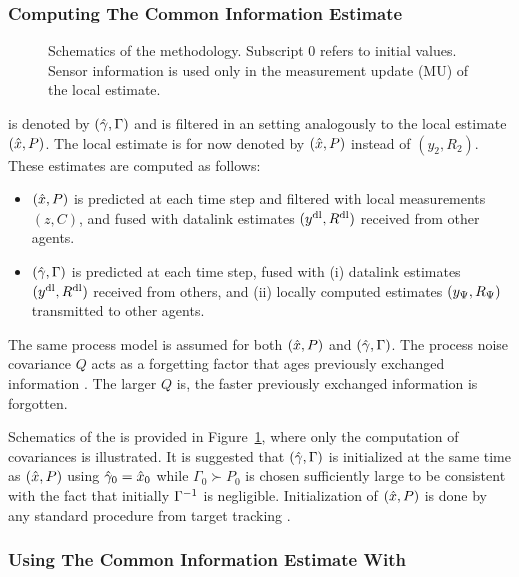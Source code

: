 \subsubsection{Computing The Common Information Estimate}

\begin{figure}[t]
	\centering
	\begin{tikzpicture}[scale=.52]
		
	\end{tikzpicture}
	\caption{Schematics of the \abbrCIE methodology. Subscript 0 refers to initial values. Sensor information is used only in the measurement update (MU) of the local estimate. } 
	\label{fig:cie:filtering-scheme}
\end{figure}

\abbrCIE is denoted by $(\gammahat,\Gamma)$ and is filtered in an \abbrEKF setting analogously to the local estimate $(\xhat,P)$. The local estimate is for now denoted by $(\xhat,P)$ instead of $(y_2,R_2)$. These estimates are computed as follows:
\begin{itemize}
	\item $(\xhat,P)$ is predicted at each time step and filtered with local measurements $(z,C)$, and fused with datalink estimates $(\yDL,\RDL)$ received from other agents.
	\item $(\gammahat,\Gamma)$ is predicted at each time step, fused with (i) datalink estimates $(\yDL,\RDL)$ received from others, and (ii) locally computed \abbrDR estimates $(\yM,\RM)$ transmitted to other agents. 
\end{itemize} 
The same process model is assumed for both $(\xhat,P)$ and $(\gammahat,\Gamma)$. The process noise covariance $Q$ acts as a forgetting factor that ages previously exchanged information \cite{Forsling2020Fusion}. The larger $Q$ is, the faster previously exchanged information is forgotten.

Schematics of the \abbrCIE is provided in Figure~\ref{fig:cie:filtering-scheme}, where only the computation of covariances is illustrated. It is suggested that $(\gammahat,\Gamma)$ is initialized at the same time as $(\xhat,P)$ using $\gammahat_0=\xhat_0$ while $\Gamma_0\succ P_0$ is chosen sufficiently large to be consistent with the fact that initially $\Gamma\inv$ is negligible. Initialization of $(\xhat,P)$ is done by any standard procedure from target tracking \cite{Blackman1999MTS}.


\subsubsection{Using The Common Information Estimate With \abbrGEVO}

